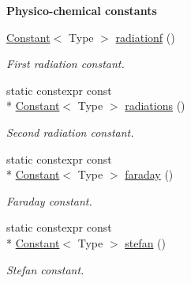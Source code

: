 \begin{Indent}{\bf Physico-\/chemical constants}
\begin{DoxyCompactItemize}
\hyperlink{exceptionmagrathea_1_1Constant}{Constant}$<$ Type $>$ \hyperlink{exceptionmagrathea_1_1Constants_afe6ed92781a1f3ea089869d3ca400a08}{radiationf} ()
\begin{DoxyCompactList}\small\item\em First radiation constant. \end{DoxyCompactList}\item 
static constexpr const \\*
\hyperlink{exceptionmagrathea_1_1Constant}{Constant}$<$ Type $>$ \hyperlink{exceptionmagrathea_1_1Constants_a37943d18596c5ce261e0b1ee3b682232}{radiations} ()
\begin{DoxyCompactList}\small\item\em Second radiation constant. \end{DoxyCompactList}\item 
static constexpr const \\*
\hyperlink{exceptionmagrathea_1_1Constant}{Constant}$<$ Type $>$ \hyperlink{exceptionmagrathea_1_1Constants_a579ecb8aaaad2ff9eb01c89087f7afb9}{faraday} ()
\begin{DoxyCompactList}\small\item\em Faraday constant. \end{DoxyCompactList}\item 
static constexpr const \\*
\hyperlink{exceptionmagrathea_1_1Constant}{Constant}$<$ Type $>$ \hyperlink{exceptionmagrathea_1_1Constants_a8cc686263b45ccc4660bacb46d915f82}{stefan} ()
\begin{DoxyCompactList}\small\item\em Stefan constant. \end{DoxyCompactList}\end{DoxyCompactItemize}
\end{Indent}
